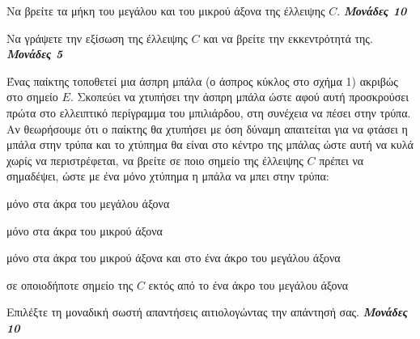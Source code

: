 \documentclass[11pt,a4paper,twoside]{book}
\newcommand{\monades}[1]{
\hspace*{\fill}
\textbf{\textit{\textcolor{maincolor}{Μονάδες #1}}}}
\begin{document}
\begin{alist}    \item Να βρείτε τα μήκη του μεγάλου και του μικρού άξονα της έλλειψης $C$. \monades{10}
    \item Να γράψετε την εξίσωση της έλλειψης $C$ και να βρείτε την εκκεντρότητά της. \monades{5}
    \item Ένας παίκτης τοποθετεί μια άσπρη μπάλα (ο άσπρος κύκλος στο σχήμα 1) ακριβώς στο σημείο $E$. Σκοπεύει να χτυπήσει την άσπρη μπάλα ώστε αφού αυτή προσκρούσει πρώτα στο ελλειπτικό περίγραμμα του μπιλιάρδου, στη συνέχεια να πέσει στην τρύπα. Αν θεωρήσουμε ότι ο παίκτης θα χτυπήσει με όση δύναμη απαιτείται για να φτάσει η μπάλα στην τρύπα και το χτύπημα θα είναι στο κέντρο της μπάλας ώστε αυτή να κυλά χωρίς να περιστρέφεται, να βρείτε σε ποιο σημείο της έλλειψης $C$ πρέπει να σημαδέψει, ώστε με ένα μόνο χτύπημα η μπάλα να μπει στην τρύπα:
    \begin{rlist}
        \item μόνο στα άκρα του μεγάλου άξονα
        \item μόνο στα άκρα του μικρού άξονα
        \item μόνο στα άκρα του μικρού άξονα και στο ένα άκρο του μεγάλου άξονα
        \item σε οποιοδήποτε σημείο της $C$ εκτός από το ένα άκρο του μεγάλου άξονα
    \end{rlist}
 Επιλέξτε τη μοναδική σωστή απαντήσεις αιτιολογώντας την απάντησή σας. \monades{10}\end{alist}
\end{document}
